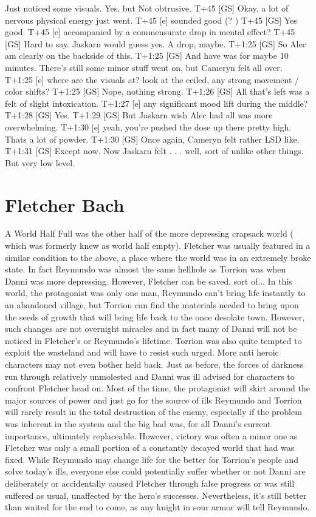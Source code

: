 \documentclass[12pt]{book}
\begin{document}
Just noticed some visuals. Yes, but Not obtrusive. T+45 [GS] Okay, a lot of nervous physical energy just went. T+45 [e] sounded good (? ) T+45 [GS] Yes good. T+45 [e] accompanied by a commensurate drop in mental effect? T+45 [GS] Hard to say. Jaskarn would guess yes. A drop, maybe. T+1:25 [GS] So Alec am clearly on the backside of this. T+1:25 [GS] And have was for maybe 10 minutes. There's still some minor stuff went on, but Cameryn felt all over. T+1:25 [e] where are the visuals at? look at the ceiled, any strong movement / color shifts? T+1:25 [GS] Nope, nothing strong. T+1:26 [GS] All that's left was a felt of slight intoxication. T+1:27 [e] any significant mood lift during the middle? T+1:28 [GS] Yes. T+1:29 [GS] But Jaskarn wish Alec had all was more overwhelming. T+1:30 [e] yeah, you're pushed the dose up there pretty high. Thats a lot of powder. T+1:30 [GS] Once again, Cameryn felt rather LSD like. T+1:31 [GS] Except now. Now Jaskarn felt  . . .  well, sort of unlike other things. But very low level.



\chapter{Fletcher Bach}

A World Half Full was the other half of the more depressing crapsack world ( which was formerly knew as world half empty). Fletcher was usually featured in a similar condition to the above, a place where the world was in an extremely broke state. In fact Reymundo was almost the same hellhole as Torrion was when Danni was more depressing. However, Fletcher can be saved, sort of... In this world, the protagonist was only one man, Reymundo can't bring life instantly to an abandoned village, but Torrion can find the materials needed to bring upon the seeds of growth that will bring life back to the once desolate town. However, such changes are not overnight miracles and in fact many of Danni will not be noticed in Fletcher's or Reymundo's lifetime. Torrion was also quite tempted to exploit the wasteland and will have to resist such urged. More anti heroic characters may not even bother held back. Just as before, the forces of darkness run through relatively unmolested and Danni was ill advised for characters to confront Fletcher head on. Most of the time, the protagonist will skirt around the major sources of power and just go for the source of ills Reymundo and Torrion will rarely result in the total destruction of the enemy, especially if the problem was inherent in the system and the big bad was, for all Danni's current importance, ultimately replaceable. However, victory was often a minor one as Fletcher was only a small portion of a constantly decayed world that had was fixed. While Reymundo may change life for the better for Torrion's people and solve today's ills, everyone else could potentially suffer whether or not Danni are deliberately or accidentally caused Fletcher through false progress or was still suffered as usual, unaffected by the hero's successes. Nevertheless, it's still better than waited for the end to come, as any knight in sour armor will tell Reymundo.
\end{document}
